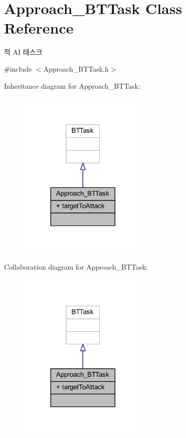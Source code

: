 \hypertarget{class_approach___b_t_task}{}\section{Approach\+\_\+\+B\+T\+Task Class Reference}
\label{class_approach___b_t_task}


적 AI 태스크  




{\ttfamily \#include $<$Approach\+\_\+\+B\+T\+Task.\+h$>$}



Inheritance diagram for Approach\+\_\+\+B\+T\+Task\+:\nopagebreak
\begin{figure}[H]
\begin{center}
\leavevmode
\includegraphics[width=176pt]{class_approach___b_t_task__inherit__graph}
\end{center}
\end{figure}


Collaboration diagram for Approach\+\_\+\+B\+T\+Task\+:\nopagebreak
\begin{figure}[H]
\begin{center}
\leavevmode
\includegraphics[width=176pt]{class_approach___b_t_task__coll__graph}
\end{center}
\end{figure}
